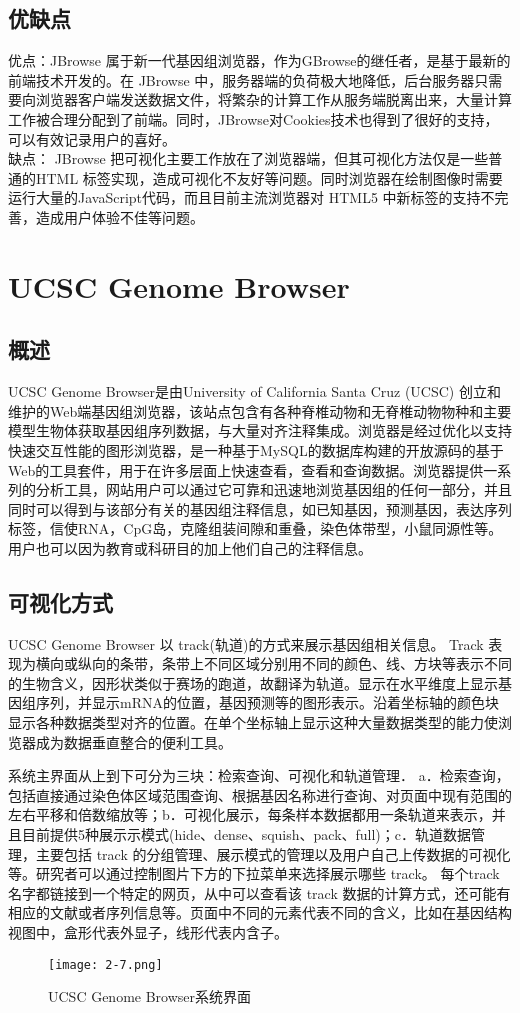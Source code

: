 		\subsection{优缺点}
		优点：JBrowse 属于新一代基因组浏览器，作为GBrowse的继任者，是基于最新的前端技术开发的。在 JBrowse 中，服务器端的负荷极大地降低，后台服务器只需要向浏览器客户端发送数据文件，将繁杂的计算工作从服务端脱离出来，大量计算工作被合理分配到了前端。同时，JBrowse对Cookies技术也得到了很好的支持，可以有效记录用户的喜好。\\
		\indent 缺点： JBrowse 把可视化主要工作放在了浏览器端，但其可视化方法仅是一些普通的HTML 标签实现，造成可视化不友好等问题。同时浏览器在绘制图像时需要运行大量的JavaScript代码，而且目前主流浏览器对 HTML5 中新标签的支持不完善，造成用户体验不佳等问题。
	\section{UCSC Genome Browser}		
			\subsection{概述}	
			UCSC Genome Browser是由University of California Santa Cruz (UCSC) 创立和维护的Web端基因组浏览器，该站点包含有各种脊椎动物和无脊椎动物物种和主要模型生物体获取基因组序列数据，与大量对齐注释集成。浏览器是经过优化以支持快速交互性能的图形浏览器，是一种基于MySQL的数据库构建的开放源码的基于Web的工具套件，用于在许多层面上快速查看，查看和查询数据。浏览器提供一系列的分析工具，网站用户可以通过它可靠和迅速地浏览基因组的任何一部分，并且同时可以得到与该部分有关的基因组注释信息，如已知基因，预测基因，表达序列标签，信使RNA，CpG岛，克隆组装间隙和重叠，染色体带型，小鼠同源性等。用户也可以因为教育或科研目的加上他们自己的注释信息。
			\subsection{可视化方式}		
			UCSC Genome Browser 以 track(轨道)的方式来展示基因组相关信息。 Track 表现为横向或纵向的条带，条带上不同区域分别用不同的颜色、线、方块等表示不同的生物含义，因形状类似于赛场的跑道，故翻译为轨道。显示在水平维度上显示基因组序列，并显示mRNA的位置，基因预测等的图形表示。沿着坐标轴的颜色块显示各种数据类型对齐的位置。在单个坐标轴上显示这种大量数据类型的能力使浏览器成为数据垂直整合的便利工具。
			
			系统主界面从上到下可分为三块：检索查询、可视化和轨道管理． a．检索查询，包括直接通过染色体区域范围查询、根据基因名称进行查询、对页面中现有范围的左右平移和倍数缩放等；b．可视化展示，每条样本数据都用一条轨道来表示，并且目前提供5种展示示模式(hide、dense、squish、pack、full)；c．轨道数据管理，主要包括 track 的分组管理、展示模式的管理以及用户自己上传数据的可视化等。研究者可以通过控制图片下方的下拉菜单来选择展示哪些 track。 每个track名字都链接到一个特定的网页，从中可以查看该 track 数据的计算方式，还可能有相应的文献或者序列信息等。页面中不同的元素代表不同的含义，比如在基因结构视图中，盒形代表外显子，线形代表内含子。 
			\begin{figure}[!ht]
				\centering
				\texttt{[image: 2-7.png]}
				\caption{UCSC Genome Browser系统界面}
			\end{figure}
